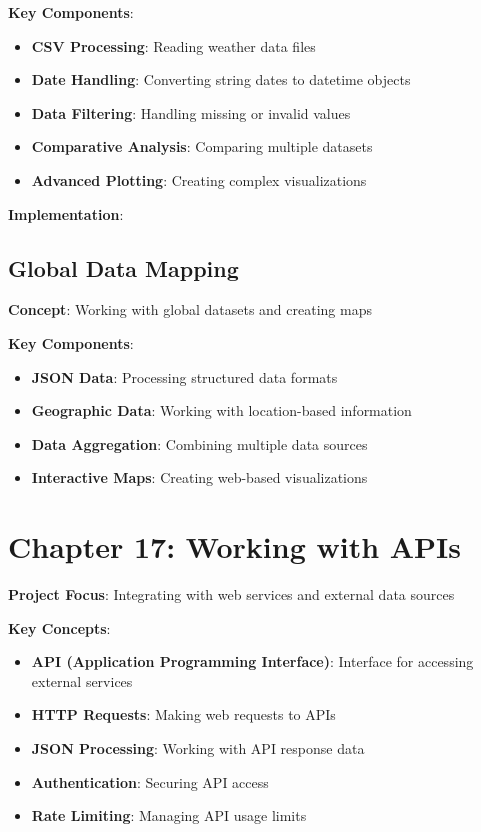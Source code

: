 \textbf{Key Components}:
\begin{itemize}
    \item \textbf{CSV Processing}: Reading weather data files
    \item \textbf{Date Handling}: Converting string dates to datetime objects
    \item \textbf{Data Filtering}: Handling missing or invalid values
    \item \textbf{Comparative Analysis}: Comparing multiple datasets
    \item \textbf{Advanced Plotting}: Creating complex visualizations
\end{itemize}

\textbf{Implementation}:


\subsection*{Global Data Mapping}
\textbf{Concept}: Working with global datasets and creating maps

\textbf{Key Components}:
\begin{itemize}
    \item \textbf{JSON Data}: Processing structured data formats
    \item \textbf{Geographic Data}: Working with location-based information
    \item \textbf{Data Aggregation}: Combining multiple data sources
    \item \textbf{Interactive Maps}: Creating web-based visualizations
\end{itemize}

\section*{Chapter 17: Working with APIs}
\textbf{Project Focus}: Integrating with web services and external data sources

\textbf{Key Concepts}:
\begin{itemize}
    \item \textbf{API (Application Programming Interface)}: Interface for accessing external services
    \item \textbf{HTTP Requests}: Making web requests to APIs
    \item \textbf{JSON Processing}: Working with API response data
    \item \textbf{Authentication}: Securing API access
    \item \textbf{Rate Limiting}: Managing API usage limits
\end{itemize}

